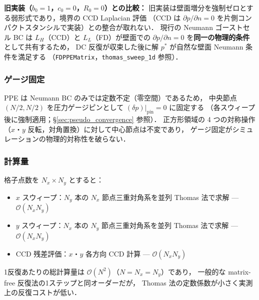 \noindent\textbf{旧実装（$b_0=1$，$c_0=0$，$R_0=0$）との比較：}
旧実装は壁面増分を強制ゼロとする弱形式であり，境界の CCD Laplacian 評価
（CCD は $\partial p/\partial n=0$ を片側コンパクトスタンシルで実装）との整合が取れない．
現行の Neumann ゴーストセル BC は $L_H$（CCD）と $L_L$（FD）が壁面での
$\partial p/\partial n = 0$ を\textbf{同一の物理的条件}として共有するため，
DC 反復が収束した後に解 $p^*$ が自然な壁面 Neumann 条件を満足する
（\texttt{FDPPEMatrix}，\texttt{thomas\_sweep\_1d} 参照）．

\subsubsection*{ゲージ固定}

PPE は Neumann BC のみでは定数不定（零空間）であるため，
中央節点 $(N/2, N/2)$ を圧力ゲージピンとして $(\delta p)|_\text{pin} = 0$ に固定する
（各スウィープ後に強制適用；§\ref{sec:pseudo_convergence} 参照）．
正方形領域の 4 つの対称操作（$x$・$y$ 反転，対角置換）に対して中心節点は不変であり，
ゲージ固定がシミュレーションの物理的対称性を破らない．

\subsubsection*{計算量}

格子点数を $N_x \times N_y$ とすると：
\begin{itemize}
  \item $x$ スウィープ：$N_y$ 本の $N_x$ 節点三重対角系を並列 Thomas 法で求解 — $\mathcal{O}(N_x N_y)$
  \item $y$ スウィープ：$N_x$ 本の $N_y$ 節点三重対角系を並列 Thomas 法で求解 — $\mathcal{O}(N_x N_y)$
  \item CCD 残差評価：$x$・$y$ 各方向 CCD 計算 — $\mathcal{O}(N_x N_y)$
\end{itemize}
1反復あたりの総計算量は $\mathcal{O}(N^2)$（$N = N_x = N_y$）であり，
一般的な matrix-free 反復法の1ステップと同オーダーだが，
Thomas 法の定数係数が小さく実測上の反復コストが低い．

